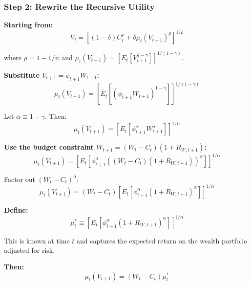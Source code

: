 \documentclass{beamer}
\begin{document}
\begin{frame}[allowframebreaks]
    \frametitle{Step 2: Rewrite the Recursive Utility}
    
    \textbf{Starting from:}
    \begin{equation*}
        V_t = \left[ (1-\delta)C_t^{\rho} + \delta \mu_t(V_{t+1})^{\rho} \right]^{1/\rho}
    \end{equation*}
    
    where $\rho = 1 - 1/\psi$ and $\mu_t(V_{t+1}) = \left[ E_t[V_{t+1}^{1-\gamma}] \right]^{1/(1-\gamma)}$.
    
    \textbf{Substitute $V_{t+1} = \phi_{t+1} W_{t+1}$:}
    \begin{equation*}
        \mu_t(V_{t+1}) = \left[ E_t[(\phi_{t+1} W_{t+1})^{1-\gamma}] \right]^{1/(1-\gamma)}
    \end{equation*}
    
    Let $\alpha \equiv 1 - \gamma$. Then:
    \begin{equation*}
        \mu_t(V_{t+1}) = \left[ E_t[\phi_{t+1}^{\alpha} W_{t+1}^{\alpha}] \right]^{1/\alpha}
    \end{equation*}
    
    \framebreak
    
    \textbf{Use the budget constraint $W_{t+1} = (W_t - C_t)(1 + R_{W,t+1})$:}
    \begin{equation*}
        \mu_t(V_{t+1}) = \left[ E_t[\phi_{t+1}^{\alpha} ((W_t - C_t)(1 + R_{W,t+1}))^{\alpha}] \right]^{1/\alpha}
    \end{equation*}
    
    Factor out $(W_t - C_t)^{\alpha}$:
    \begin{equation*}
        \mu_t(V_{t+1}) = (W_t - C_t) \left[ E_t[\phi_{t+1}^{\alpha} (1 + R_{W,t+1})^{\alpha}] \right]^{1/\alpha}
    \end{equation*}
    
    \framebreak
    
    \textbf{Define:}
    \begin{equation*}
        \mu_t^* \equiv \left[ E_t[\phi_{t+1}^{\alpha} (1 + R_{W,t+1})^{\alpha}] \right]^{1/\alpha}
    \end{equation*}
    
    This is known at time $t$ and captures the expected return on the wealth portfolio adjusted for risk.
    
    \textbf{Then:}
    \begin{equation*}
        \mu_t(V_{t+1}) = (W_t - C_t) \mu_t^*
    \end{equation*}
    

\end{frame}
\end{document}
